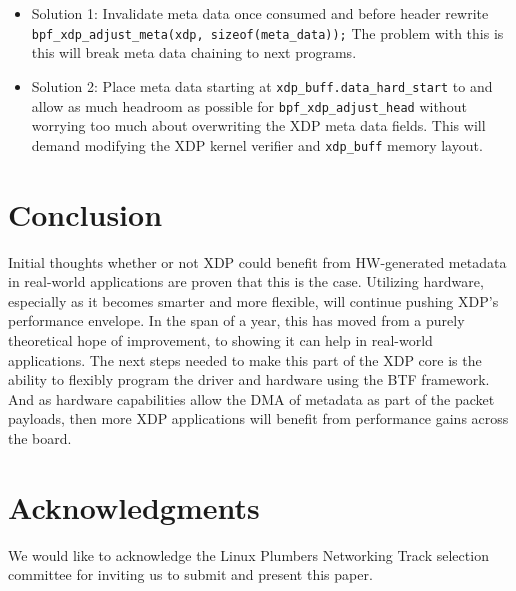 \documentclass[letterpaper]{article}
\begin{document}
\begin{itemize}
	\item Solution 1: Invalidate meta data once consumed and before header rewrite \small{\texttt{bpf\_xdp\_adjust\_meta(xdp, sizeof(meta\_data));}}
	\newline
	The problem with this is this will break meta data chaining to next programs.

	\item Solution 2: Place meta data starting at \small{\texttt{xdp\_buff.data\_hard\_start}} to and allow as much headroom as possible for \small{\texttt{bpf\_xdp\_adjust\_head}} without worrying too much about overwriting the XDP meta data fields. This will demand modifying the XDP kernel verifier and \small{\texttt{xdp\_buff}} memory layout.
\end{itemize}

\section{Conclusion}
Initial thoughts whether or not XDP could benefit from HW-generated metadata in real-world applications are proven that this is the case.  Utilizing hardware, especially as it becomes smarter and more flexible, will continue pushing XDP’s performance envelope.  In the span of a year, this has moved from a purely theoretical hope of improvement, to showing it can help in real-world applications.  The next steps needed to make this part of the XDP core is the ability to flexibly program the driver and hardware using the BTF framework.  And as hardware capabilities allow the DMA of metadata as part of the packet payloads, then more XDP applications will benefit from performance gains across the board.

\section{Acknowledgments}
We would like to acknowledge the Linux Plumbers Networking Track selection committee for inviting us to submit and present this paper.



\end{document}
